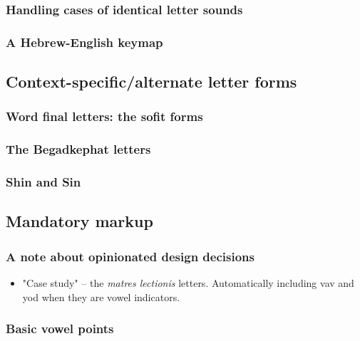 \documentclass[11pt]{article}
\begin{document}
\subsubsection{Handling cases of identical letter sounds}
\label{sec:org80f8228}

\subsubsection{A Hebrew-English keymap}
\label{sec:orgebd34e8}

\subsection{Context-specific/alternate letter forms}
\label{sec:org3925f4f}

\subsubsection{Word final letters: the sofit forms}
\label{sec:org3d93f83}

\subsubsection{The Begadkephat letters}
\label{sec:org31ed2bc}

\subsubsection{Shin and Sin}
\label{sec:org81aa206}

\subsection{Mandatory markup}
\label{sec:orgf1cf36f}

\subsubsection{A note about opinionated design decisions}
\label{sec:org8f5e2d1}

\begin{itemize}
\item "Case study" -- the \emph{matres lectionis} letters. Automatically including vav and yod when they are vowel indicators.
\end{itemize}

\subsubsection{Basic vowel points}
\label{sec:org79f3b60}
\end{document}
